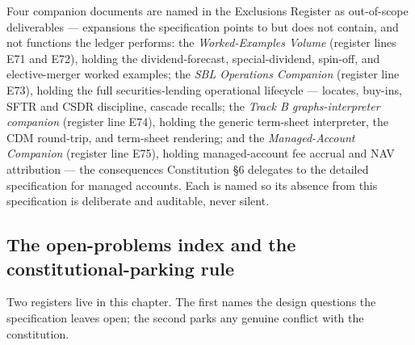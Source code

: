 Four companion documents are named in the Exclusions Register as out-of-scope
deliverables --- expansions the specification points to but does not contain, and not
functions the ledger performs: the \emph{Worked-Examples Volume} (register lines E71 and
E72), holding the dividend-forecast, special-dividend, spin-off, and elective-merger
worked examples; the \emph{SBL Operations Companion} (register line E73), holding the full
securities-lending operational lifecycle --- locates, buy-ins, SFTR and CSDR discipline,
cascade recalls; the \emph{Track B graphs-interpreter companion} (register line E74),
holding the generic term-sheet interpreter, the CDM round-trip, and term-sheet rendering;
and the \emph{Managed-Account Companion} (register line E75), holding managed-account fee
accrual and NAV attribution --- the consequences Constitution \S6 delegates to the detailed
specification for managed accounts. Each is named so its absence from this specification is
deliberate and auditable, never silent.

\subsection{The open-problems index and the constitutional-parking rule}

Two registers live in this chapter. The first names the design questions the specification
leaves open; the second parks any genuine conflict with the constitution.

